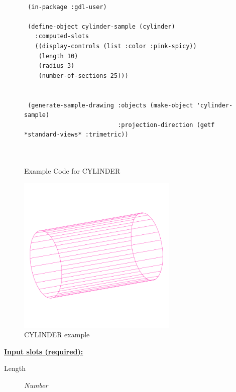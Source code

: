 \documentclass [11pt]{book}
\begin{document}
\begin{itemize}
\begin{figure}
\begin{lrbox}{\boxedverb}
\begin{minipage}{\linewidth}
{\begin{verbatim}

 (in-package :gdl-user)

 (define-object cylinder-sample (cylinder)
   :computed-slots
   ((display-controls (list :color :pink-spicy))
    (length 10)
    (radius 3)
    (number-of-sections 25)))


 (generate-sample-drawing :objects (make-object 'cylinder-sample)
                          :projection-direction (getf *standard-views* :trimetric))
   


\end{verbatim}}
\end{minipage}
\end{lrbox}
\fbox{\usebox{\boxedverb}}

\caption{Example Code for CYLINDER}

\label{fig:example-code-CYLINDER}

\end{figure}

\begin{figure}
\begin{center}
\includegraphics[width=3in,height=3in]{../images/example-CYLINDER.pdf}
\end{center}

\caption{CYLINDER example}

\label{fig:CYLINDER}

\end{figure}





\textbf{
\underline{Input slots (required):}}

\begin{description}

\item [Length]
\emph{Number}


\end{description}
\end{itemize}
\end{document}
